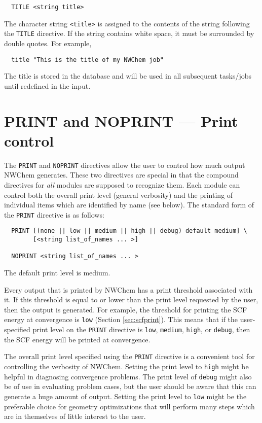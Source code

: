 \begin{verbatim}
  TITLE <string title>
\end{verbatim}

The character string \verb+<title>+ is assigned to the contents of the
string following the \verb+TITLE+ directive.  If the string contains
white space, it must be surrounded by double quotes.  For example,

\begin{verbatim}
  title "This is the title of my NWChem job"
\end{verbatim}

The title is stored in the database and will be used in all subsequent
tasks/jobs until redefined in the input.

\section{PRINT and NOPRINT --- Print control}
\label{sec:printcontrol}

The \verb+PRINT+ and \verb+NOPRINT+ directives allow the user to
control how much output NWChem generates.  These two directives are
special in that the compound directives for {\em all} modules are
supposed to recognize them. Each module can control both the overall
print level (general verbosity) and the printing of individual items
which are identified by name (see below).  The standard form of the
\verb+PRINT+ directive is as follows:

\begin{verbatim}
  PRINT [(none || low || medium || high || debug) default medium] \
        [<string list_of_names ... >]

  NOPRINT <string list_of_names ... >
\end{verbatim}
The default print level is medium.

Every output that is printed by NWChem has a print threshold
associated with it. If this threshold is equal to or lower than the
print level requested by the user, then the output is generated.  For
example, the threshold for printing the SCF energy at convergence is
\verb+low+ (Section \ref{sec:scfprint}).  This means that if the
user-specified print level on the \verb+PRINT+ directive is
\verb+low+, \verb+medium+, \verb+high+, or \verb+debug+, then the SCF
energy will be printed at convergence.

The overall print level specified
using the \verb+PRINT+ directive is a convenient tool for controlling 
the verbosity
of NWChem. Setting the print level to \verb+high+ might be helpful in
diagnosing convergence problems.  The print level of \verb+debug+ might
also be of use in evaluating problem cases, but the user should be aware
that this can generate a huge amount of output.  Setting the print level
to \verb+low+ might be the preferable choice for geometry
optimizations that will perform many steps which are in themselves of
little interest to the user.

